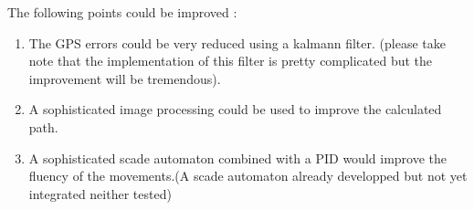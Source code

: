 The following points could be improved :
\begin{enumerate}
\item The GPS errors could be very reduced using a kalmann filter. (please take note that the implementation of this filter is pretty complicated but the improvement will be tremendous).
\item A sophisticated image processing could be used to improve the calculated path.
\item A sophisticated scade automaton combined with a PID would improve the fluency of the movements.(A scade automaton already developped but not yet integrated neither tested)
\end{enumerate}


